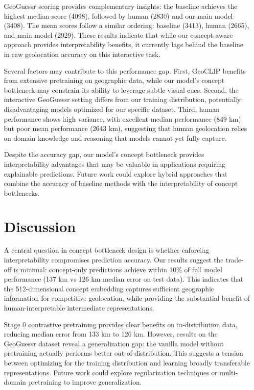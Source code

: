 \documentclass{uva-inf-article}
\begin{document}
GeoGuessr scoring provides complementary insights: the baseline achieves the highest median score (4098), followed by human (2830) and our main model (3408). The mean scores follow a similar ordering: baseline (3413), human (2665), and main model (2929). These results indicate that while our concept-aware approach provides interpretability benefits, it currently lags behind the baseline in raw geolocation accuracy on this interactive task.

Several factors may contribute to this performance gap. First, GeoCLIP benefits from extensive pretraining on geographic data, while our model's concept bottleneck may constrain its ability to leverage subtle visual cues. Second, the interactive GeoGuessr setting differs from our training distribution, potentially disadvantaging models optimized for our specific dataset. Third, human performance shows high variance, with excellent median performance (849 km) but poor mean performance (2643 km), suggesting that human geolocation relies on domain knowledge and reasoning that models cannot yet fully capture.

Despite the accuracy gap, our model's concept bottleneck provides interpretability advantages that may be valuable in applications requiring explainable predictions. Future work could explore hybrid approaches that combine the accuracy of baseline methods with the interpretability of concept bottlenecks.


\section{Discussion}
\label{sec:discussion}

A central question in concept bottleneck design is whether enforcing interpretability compromises prediction accuracy. Our results suggest the trade-off is minimal: concept-only predictions achieve within 10\% of full model performance (137 km vs 126 km median error on test data). This indicates that the 512-dimensional concept embedding captures sufficient geographic information for competitive geolocation, while providing the substantial benefit of human-interpretable intermediate representations.

Stage 0 contrastive pretraining provides clear benefits on in-distribution data, reducing median error from 133 km to 126 km. However, results on the GeoGuessr dataset reveal a generalization gap: the vanilla model without pretraining actually performs better out-of-distribution. This suggests a tension between optimizing for the training distribution and learning broadly transferable representations. Future work could explore regularization techniques or multi-domain pretraining to improve generalization.
\end{document}
